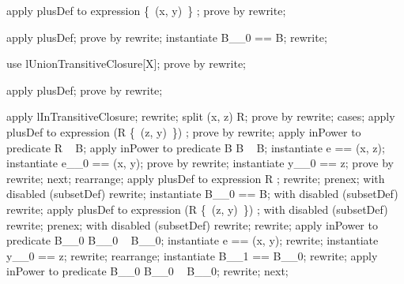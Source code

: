 \begin{LPScript}\begin{forget}[lUnitTransitiveClosure]
apply plusDef to expression \{~(x, y)~\} \plus [X];
prove by rewrite;
\end{forget}
\end{LPScript}

\begin{LPScript}\begin{forget}[lUnionTransitiveClosure]
apply plusDef;
prove by rewrite;
instantiate B\_\_0 == B;
rewrite;
\end{forget}\end{LPScript}

\begin{LPScript}\begin{forget}[lUnionTransitiveClosure2]
use lUnionTransitiveClosure[X];
prove by rewrite;
\end{forget}\end{LPScript}

\begin{LPScript}\begin{forget}[lInTransitiveClosure]
apply plusDef;
prove by rewrite;
\end{forget}\end{LPScript}

\begin{LPScript}\begin{forget}[lUnionSingletonTransitiveClosure]
apply lInTransitiveClosure;
rewrite;
split (x, z) \in  R;
prove by rewrite;
cases;
apply plusDef to expression (R \cup [(X \cross  X)] \{~(z, y)~\}) \plus [X];
prove by rewrite;
apply inPower to predicate R \in  \power~  B;
apply inPower to predicate B \comp [X, X, X] B \in  \power~  B;
instantiate e == (x, z);
instantiate e\_\_0 == (x, y);
prove by rewrite;
instantiate y\_\_0 == z;
prove by rewrite;
next;
rearrange;
apply plusDef to expression R \plus [X];
rewrite;
prenex;
with disabled (subsetDef) rewrite;
instantiate B\_\_0 == B;
with disabled (subsetDef) rewrite;
apply plusDef to expression (R \cup [(X \cross  X)] \{~(z, y)~\}) \plus [X];
with disabled (subsetDef) rewrite;
prenex;
with disabled (subsetDef) rewrite;
rewrite;
apply inPower to predicate B\_\_0 \comp [X, X, X] B\_\_0 \in  \power~  B\_\_0;
instantiate e == (x, y);
rewrite;
instantiate y\_\_0 == z;
rewrite;
rearrange;
instantiate B\_\_1 == B\_\_0;
rewrite;
apply inPower to predicate B\_\_0 \comp [X, X, X] B\_\_0 \in  \power~  B\_\_0;
rewrite;
next;
\end{forget}\end{LPScript}

